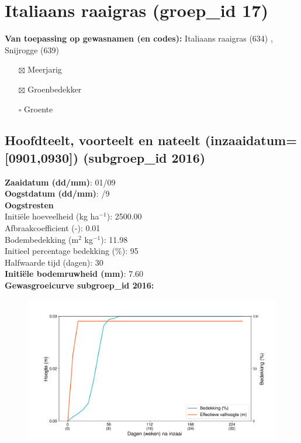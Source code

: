 \documentclass{article}
\begin{document}
 \section{Italiaans raaigras (groep\_id 17)} 
 \textbf{Van toepassing op gewasnamen (en codes):} Italiaans raaigras (634) , Snijrogge (639) 
 \begin{multicols}{3} \begin{itemize} \item[$\boxtimes$] Meerjarig \item[$\boxtimes$] Groenbedekker \item[$\square$] Groente \end{itemize} \end{multicols} 
 \subsection{Hoofdteelt, voorteelt en nateelt (inzaaidatum=[0901,0930]) (subgroep\_id 2016)} 
  \textbf{Zaaidatum (dd/mm)}: 01/09  \vspace{0.10cm} \\ 
  \textbf{Oogstdatum (dd/mm)}: /9  \vspace{0.10cm} \\ 
  \textbf{Oogstresten} \vspace{0.05cm} \\ 
  \tab Initi\"{e}le hoeveelheid (kg ha$^{-1}$): 2500.00 \vspace{0.05cm} \\ 
  \tab Afbraakcoefficient (-): 0.01 \vspace{0.05cm} \\ 
  \tab Bodembedekking (m$^2$ kg$^{-1}$): 11.98 \vspace{0.05cm} \\ 
  \tab Initieel percentage bedekking (\%): 95 \vspace{0.05cm} \\ 
  \tab Halfwaarde tijd (dagen): 30 \vspace{0.05cm} \\ 
  \textbf{Initi\"{e}le bodemruwheid (mm)}: 7.60 \vspace{0.05cm} \\ 
  \textbf{Gewasgroeicurve subgroep\_id 2016:} 
 \begin{center} \begin{figure}[H] \includegraphics[width=12.5cm]{temp/2016.png} \end{figure} \end{center} 
\end{document}
